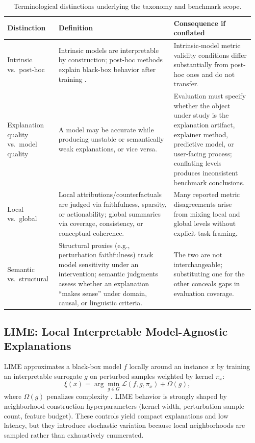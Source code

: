 \documentclass[twoside,11pt]{article}
\begin{document}
\begin{table}[t]
\centering
\caption{Terminological distinctions underlying the taxonomy and benchmark scope.}
\label{tab:background_distinctions}
\begin{tabularx}{\linewidth}{p{2.6cm} X X}
\toprule
\textbf{Distinction} & \textbf{Definition} & \textbf{Consequence if conflated} \\
\midrule
Intrinsic vs.\ post-hoc &
Intrinsic models are interpretable by construction; post-hoc methods
explain black-box behavior after training \citep{rudin2019stop,retzlaff2024posthoc}. &
Intrinsic-model metric validity conditions differ substantially from
post-hoc ones and do not transfer. \\[4pt]
Explanation quality vs.\ model quality &
A model may be accurate while producing unstable or semantically weak
explanations, or vice versa. &
Evaluation must specify whether the object under study is the
explanation artifact, explainer method, predictive model, or user-facing
process; conflating levels produces inconsistent benchmark conclusions. \\[4pt]
Local vs.\ global &
Local attributions/counterfactuals are judged via faithfulness, sparsity,
or actionability; global summaries via coverage, consistency, or
conceptual coherence. &
Many reported metric disagreements arise from mixing local and global
levels without explicit task framing. \\[4pt]
Semantic vs.\ structural &
Structural proxies (e.g., perturbation faithfulness) track model
sensitivity under an intervention; semantic judgments assess whether an
explanation ``makes sense'' under domain, causal, or linguistic criteria. &
The two are not interchangeable; substituting one for the other conceals
gaps in evaluation coverage. \\
\bottomrule
\end{tabularx}
\end{table}

\subsection{LIME: Local Interpretable Model-Agnostic Explanations}

LIME approximates a black-box model $f$ locally around an instance $x$
by training an interpretable surrogate $g$ on perturbed samples weighted
by kernel $\pi_x$:
\[
\xi(x) = \arg\min_{g \in G} \mathcal{L}(f, g, \pi_x) + \Omega(g),
\]
where $\Omega(g)$ penalizes complexity \citep{ribeiro2016why}. LIME
behavior is strongly shaped by neighborhood construction hyperparameters
(kernel width, perturbation sample count, feature budget). These controls
yield compact explanations and low latency, but they introduce stochastic
variation because local neighborhoods are sampled rather than exhaustively
enumerated.
\end{document}
